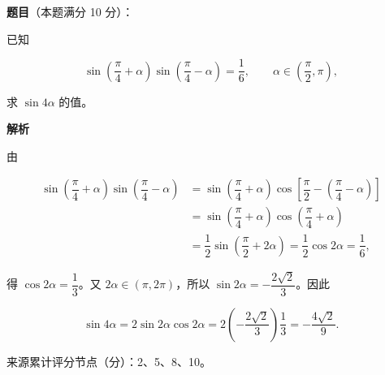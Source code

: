 \begin{answer}

\textbf{题目}（本题满分 10 分）：

已知

\nopagebreak[4]
\[
\sin\left(\dfrac{\pi}{4}+\alpha\right)\sin\left(\dfrac{\pi}{4}-\alpha\right)=\dfrac16,
\qquad \alpha\in\left(\dfrac\pi2,\pi\right),
\]

求 $\sin4\alpha$ 的值。

\textbf{解析}

由

\nopagebreak[4]
\[
\begin{aligned}
\sin\left(\dfrac\pi4+\alpha\right)\sin\left(\dfrac\pi4-\alpha\right)
&=\sin\left(\dfrac\pi4+\alpha\right)
\cos\left[\dfrac\pi2-\left(\dfrac\pi4-\alpha\right)\right]\\
&=\sin\left(\dfrac\pi4+\alpha\right)\cos\left(\dfrac\pi4+\alpha\right)\\
&=\dfrac12\sin\left(\dfrac\pi2+2\alpha\right)
=\dfrac12\cos2\alpha=\dfrac16,
\end{aligned}
\]

得 $\cos2\alpha=\dfrac13$。又 $2\alpha\in(\pi,2\pi)$，所以 $\sin2\alpha=-\dfrac{2\sqrt2}{3}$。因此

\nopagebreak[4]
\[
\sin4\alpha=2\sin2\alpha\cos2\alpha
=2\left(-\dfrac{2\sqrt2}{3}\right)\dfrac13
=-\dfrac{4\sqrt2}{9}.
\]

来源累计评分节点（分）：2、5、8、10。


\end{answer}
